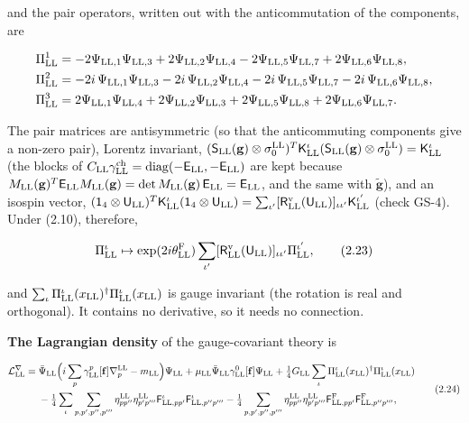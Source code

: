 \documentclass[
  10pt,
]{article}
\begin{document}
and the pair operators, written out with the anticommutation of the
components, are

\[\begin{aligned}
\Pi^1_{\rm LL}&=-2\Psi_{{\rm LL},1}\Psi_{{\rm LL},3}+2\Psi_{{\rm LL},2}\Psi_{{\rm LL},4}-2\Psi_{{\rm LL},5}\Psi_{{\rm LL},7}+2\Psi_{{\rm LL},6}\Psi_{{\rm LL},8},\\
\Pi^2_{\rm LL}&=-2i\,\Psi_{{\rm LL},1}\Psi_{{\rm LL},3}-2i\,\Psi_{{\rm LL},2}\Psi_{{\rm LL},4}-2i\,\Psi_{{\rm LL},5}\Psi_{{\rm LL},7}-2i\,\Psi_{{\rm LL},6}\Psi_{{\rm LL},8},\\
\Pi^3_{\rm LL}&=2\Psi_{{\rm LL},1}\Psi_{{\rm LL},4}+2\Psi_{{\rm LL},2}\Psi_{{\rm LL},3}+2\Psi_{{\rm LL},5}\Psi_{{\rm LL},8}+2\Psi_{{\rm LL},6}\Psi_{{\rm LL},7}.
\end{aligned}\]

The pair matrices are antisymmetric (so that the anticommuting
components give a non-zero pair), Lorentz invariant,
\((\mathsf S_{\rm LL}(\mathbf g)\otimes\sigma^{\rm LL}_0)^T\mathsf K^\iota_{\rm LL}(\mathsf S_{\rm LL}(\mathbf g)\otimes\sigma^{\rm LL}_0)=\mathsf K^\iota_{\rm LL}\)
(the blocks of
\(C_{\rm LL}\gamma^{\rm ch}_{\rm LL}=\mathrm{diag}(-\mathsf E_{\rm LL},-\mathsf E_{\rm LL})\)
are kept because
\(M_{\rm LL}(\mathbf g)^T\mathsf E_{\rm LL}M_{\rm LL}(\mathbf g)=\det M_{\rm LL}(\mathbf g)\,\mathsf E_{\rm LL}=\mathsf E_{\rm LL}\),
and the same with \(\tilde{\mathbf g}\)), and an isospin vector,
\((\mathsf 1_4\otimes\mathsf U_{\rm LL})^T\mathsf K^\iota_{\rm LL}(\mathsf 1_4\otimes\mathsf U_{\rm LL})=\sum_{\iota'}[\mathsf R^{\rm v}_{\rm LL}(\mathsf U_{\rm LL})]_{\iota\iota'}\mathsf K^{\iota'}_{\rm LL}\)
(check GS-4). Under (2.10), therefore,

\[\Pi^\iota_{\rm LL}\mapsto\exp(2i\theta^{\rm F}_{\rm LL})\sum_{\iota'}[\mathsf R^{\rm v}_{\rm LL}(\mathsf U_{\rm LL})]_{\iota\iota'}\Pi^{\iota'}_{\rm LL},\tag{2.23}\]

and
\(\sum_\iota\Pi^\iota_{\rm LL}(x_{\rm LL})^\dagger\Pi^\iota_{\rm LL}(x_{\rm LL})\)
is gauge invariant (the rotation is real and orthogonal). It contains no
derivative, so it needs no connection.

\textbf{The Lagrangian density} of the gauge-covariant theory is

\[\begin{aligned}
\mathcal L^\nabla_{\rm LL}={}&\bar\Psi_{\rm LL}\Big(i\sum_p\gamma^p_{\rm LL}[\mathbf f]\nabla^{\rm LL}_p-m_{\rm LL}\Big)\Psi_{\rm LL}+\mu_{\rm LL}\bar\Psi_{\rm LL}\gamma^0_{\rm LL}[\mathbf f]\Psi_{\rm LL}+\tfrac14G_{\rm LL}\sum_\iota\Pi^\iota_{\rm LL}(x_{\rm LL})^\dagger\Pi^\iota_{\rm LL}(x_{\rm LL})\\
&-\tfrac14\sum_\iota\sum_{p,p',p'',p'''}\eta^{\rm LL}_{pp''}\eta^{\rm LL}_{p'p'''}\mathsf F^\iota_{{\rm LL},pp'}\mathsf F^\iota_{{\rm LL},p''p'''}-\tfrac14\sum_{p,p',p'',p'''}\eta^{\rm LL}_{pp''}\eta^{\rm LL}_{p'p'''}\mathsf F^{\rm F}_{{\rm LL},pp'}\mathsf F^{\rm F}_{{\rm LL},p''p'''},
\end{aligned}\tag{2.24}\]
\end{document}
